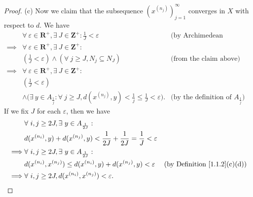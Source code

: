 \begin{proof}{(c)}
    Now we claim that the subsequence \((x^{(n_j)})_{j = 1}^\infty\) converges in \(X\) with respect to \(d\).
    We have
    \begin{align*}
                 & \forall\ \varepsilon \in \mathbf{R}^+, \exists\ J \in \mathbf{Z}^+ : \frac{1}{J} < \varepsilon                                    & \text{(by Archimedean property)}                  \\
        \implies & \forall\ \varepsilon \in \mathbf{R}^+, \exists\ J \in \mathbf{Z}^+ :                                                                                                                  \\
                 & (\frac{1}{J} < \varepsilon) \land (\forall\ j \geq J, N_j \subseteq N_J)                                                          & \text{(from the claim above)}                     \\
        \implies & \forall\ \varepsilon \in \mathbf{R}^+, \exists\ J \in \mathbf{Z}^+ :                                                                                                                  \\
                 & (\frac{1}{J} < \varepsilon)                                                                                                                                                           \\
                 & \land \big(\exists\ y \in A_{\frac{1}{j}} : \forall\ j \geq J, d(x^{(n_j)}, y) < \frac{1}{j} \leq \frac{1}{J} < \varepsilon\big). & \text{(by the definition of \(A_{\frac{1}{j}}\))}
    \end{align*}
    If we fix \(J\) for each \(\varepsilon\), then we have
    \begin{align*}
                 & \forall\ i, j \geq 2J, \exists\ y \in A_{\frac{1}{2J}} :                                                                               \\
                 & d(x^{(n_i)}, y) + d(x^{(n_j)}, y) < \frac{1}{2J} + \frac{1}{2J} = \frac{1}{J} < \varepsilon                                            \\
        \implies & \forall\ i, j \geq 2J, \exists\ y \in A_{\frac{1}{2J}} :                                                                               \\
                 & d(x^{(n_i)}, x^{(n_j)}) \leq d(x^{(n_i)}, y) + d(x^{(n_j)}, y) < \varepsilon                & \text{(by Definition \ref{1.1.2}(c)(d))} \\
        \implies & \forall\ i, j \geq 2J, d(x^{(n_i)}, x^{(n_j)}) < \varepsilon.

\end{align*}
\end{proof}
